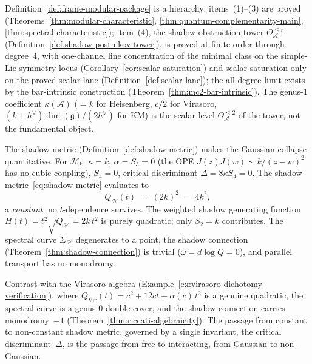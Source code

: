 \begin{remark}%
\label{rem:frame-kappa-not-fundamental}
Definition~\ref{def:frame-modular-package} is a hierarchy: items~(1)--(3) are proved (Theorems~\ref{thm:modular-characteristic}, \ref{thm:quantum-complementarity-main}, \ref{thm:spectral-characteristic}); item~(4), the shadow obstruction tower $\Theta_{\mathcal{A}}^{\leq r}$ (Definition~\ref{def:shadow-postnikov-tower}), is proved at finite order through degree~$4$, with one-channel line concentration of the minimal class on the simple-Lie-symmetry locus (Corollary~\ref{cor:scalar-saturation}) and scalar saturation only on the proved scalar lane (Definition~\ref{def:scalar-lane}); the all-degree limit exists by the bar-intrinsic construction (Theorem~\ref{thm:mc2-bar-intrinsic}). The genus-$1$ coefficient $\kappa(\mathcal{A})$ ($= k$ for Heisenberg, $c/2$ for Virasoro, $(k+h^\vee)\dim(\mathfrak{g})/(2h^\vee)$ for KM) is the scalar level $\Theta_{\mathcal{A}}^{\leq 2}$ of the tower, not the fundamental object.
\end{remark}

\begin{remark}%
\label{rem:frame-shadow-metric}
The shadow metric (Definition~\ref{def:shadow-metric}) makes the
Gaussian collapse quantitative. For $\mathcal{H}_k$:
$\kappa = k$, $\alpha = S_3 = 0$ (the OPE
$J(z)J(w) \sim k/(z-w)^2$ has no cubic coupling),
$S_4 = 0$, critical discriminant $\Delta = 8\kappa S_4 = 0$.
The shadow metric~\eqref{eq:shadow-metric} evaluates to
\[
 Q_{\mathcal{H}}(t) \;=\; (2k)^2 \;=\; 4k^2,
\]
a \emph{constant}: no $t$-dependence survives. The weighted
shadow generating function $H(t) = t^2\sqrt{Q_{\mathcal{H}}}
= 2k\,t^2$ is purely quadratic; only $S_2 = k$ contributes.
The spectral curve $\Sigma_{\mathcal{H}}$ degenerates to a
point, the shadow connection
(Theorem~\ref{thm:shadow-connection}) is trivial
($\omega = d\log Q = 0$), and parallel transport has no
monodromy.

Contrast with the Virasoro algebra
(Example~\ref{ex:virasoro-dichotomy-verification}), where
$Q_{\mathrm{Vir}}(t) = c^2 + 12ct + \alpha(c)\,t^2$ is a
genuine quadratic, the spectral curve is a genus-$0$ double
cover, and the shadow connection carries monodromy~$-1$
(Theorem~\ref{thm:riccati-algebraicity}). The
passage from constant to non-constant shadow metric, governed
by a single invariant, the critical discriminant~$\Delta$, is
the passage from free to interacting, from Gaussian to
non-Gaussian.
\end{remark}


